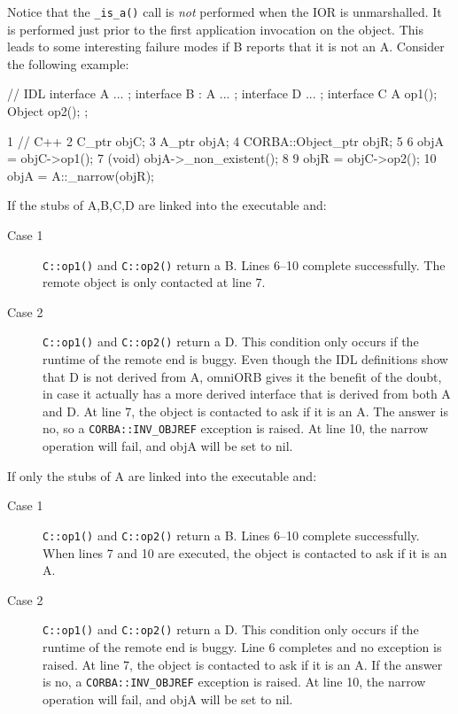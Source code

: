 \documentclass[11pt,twoside,a4paper]{book}
\newcommand{\code}[1]{\texttt{#1}}
\newcommand{\op}[1]{\texttt{#1()}}
\begin{document}
Notice that the \op{\_is\_a} call is \emph{not} performed when the IOR
is unmarshalled. It is performed just prior to the first application
invocation on the object. This leads to some interesting failure modes
if B reports that it is not an A. Consider the following example:

\begin{idllisting}
// IDL
interface A { ... };
interface B : A { ... };
interface D { ... };
interface C {
  A      op1();
  Object op2();
};
\end{idllisting}

\lstset{stepnumber=1,gobble=4}
\begin{cxxlisting}
 1  // C++
 2  C_ptr objC;
 3  A_ptr objA;
 4  CORBA::Object_ptr objR;
 5
 6  objA =  objC->op1();
 7  (void) objA->_non_existent();
 8
 9  objR =  objC->op2();
10  objA =  A::_narrow(objR);
\end{cxxlisting}
\lstset{stepnumber=0,gobble=0}

\noindent If the stubs of A,B,C,D are linked into the executable and:

\begin{description}
\item[Case 1] \op{C::op1} and \op{C::op2} return a B. Lines 6--10
complete successfully. The remote object is only contacted at line 7.

\item[Case 2] \op{C::op1} and \op{C::op2} return a D. This condition
only occurs if the runtime of the remote end is buggy. Even though the
IDL definitions show that D is not derived from A, omniORB gives it
the benefit of the doubt, in case it actually has a more derived
interface that is derived from both A and D. At line 7, the object is
contacted to ask if it is an A. The answer is no, so a
\code{CORBA::INV\_OBJREF} exception is raised. At line 10, the narrow
operation will fail, and objA will be set to nil.
\end{description}

\noindent If only the stubs of A are linked into the executable and:

\begin{description}
\item[Case 1] \op{C::op1} and \op{C::op2} return a B. Lines 6--10
complete successfully. When lines 7 and 10 are executed, the object is
contacted to ask if it is an A.

\item[Case 2] \op{C::op1} and \op{C::op2} return a D. This condition
only occurs if the runtime of the remote end is buggy. Line 6
completes and no exception is raised. At line 7, the object is
contacted to ask if it is an A. If the answer is no, a
\code{CORBA::INV\_OBJREF} exception is raised. At line 10, the narrow
operation will fail, and objA will be set to nil.
\end{description}
\end{document}
